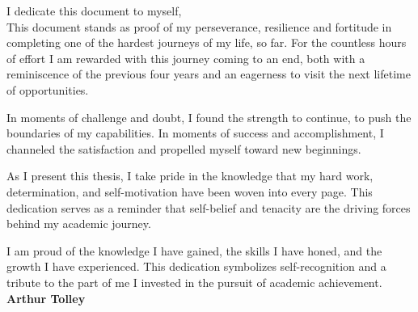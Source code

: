 I dedicate this document to myself,
\\

This document stands as proof of my perseverance, resilience and fortitude in completing one of the hardest journeys of my life, so far. For the countless hours of effort I am rewarded with this journey coming to an end, both with a reminiscence of the previous four years and an eagerness to visit the next lifetime of opportunities.

In moments of challenge and doubt, I found the strength to continue, to push the boundaries of my capabilities. In moments of success and accomplishment, I channeled the satisfaction and propelled myself toward new beginnings.

As I present this thesis, I take pride in the knowledge that my hard work, determination, and self-motivation have been woven into every page. This dedication serves as a reminder that self-belief and tenacity are the driving forces behind my academic journey.

I am proud of the knowledge I have gained, the skills I have honed, and the growth I have experienced. This dedication symbolizes self-recognition and a tribute to the part of me I invested in the pursuit of academic achievement.
\\

\textbf{Arthur Tolley}